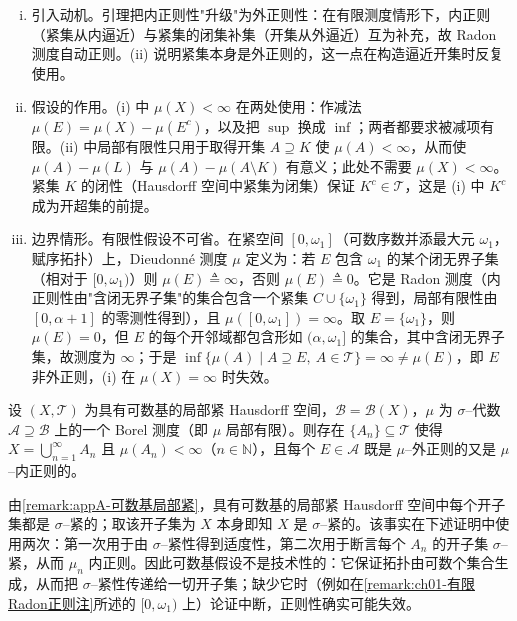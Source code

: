 \documentclass[../../main.tex]{subfiles}%
\begin{document}
\begin{remark}\label{remark:ch01-有限Radon正则注}
\begin{enumerate}[(i)]
\item 引入动机。引理把内正则性"升级"为外正则性：在有限测度情形下，内正则（紧集从内逼近）与紧集的闭集补集（开集从外逼近）互为补充，故 Radon 测度自动正则。(ii) 说明紧集本身是外正则的，这一点在构造逼近开集时反复使用。
\item 假设的作用。(i) 中 $\mu(X)<\infty$ 在两处使用：作减法 $\mu(E)=\mu(X)-\mu(E^c)$，以及把 $\sup$ 换成 $\inf$；两者都要求被减项有限。(ii) 中局部有限性只用于取得开集 $A\supseteq K$ 使 $\mu(A)<\infty$，从而使 $\mu(A)-\mu(L)$ 与 $\mu(A)-\mu(A\setminus K)$ 有意义；此处不需要 $\mu(X)<\infty$。紧集 $K$ 的闭性（Hausdorff 空间中紧集为闭集）保证 $K^c\in\mathcal{T}$，这是 (i) 中 $K^c$ 成为开超集的前提。
\item 边界情形。有限性假设不可省。在紧空间 $[0,\omega_1]$（可数序数并添最大元 $\omega_1$，赋序拓扑）上，Dieudonné 测度 $\mu$ 定义为：若 $E$ 包含 $\omega_1$ 的某个闭无界子集（相对于 $[0,\omega_1)$）则 $\mu(E)\triangleq\infty$，否则 $\mu(E)\triangleq0$。它是 Radon 测度（内正则性由"含闭无界子集"的集合包含一个紧集 $C\cup\{\omega_1\}$ 得到，局部有限性由 $[0,\alpha+1]$ 的零测性得到），且 $\mu([0,\omega_1])=\infty$。取 $E=\{\omega_1\}$，则 $\mu(E)=0$，但 $E$ 的每个开邻域都包含形如 $(\alpha,\omega_1]$ 的集合，其中含闭无界子集，故测度为 $\infty$；于是 $\inf\{\mu(A)\mid A\supseteq E,\ A\in\mathcal{T}\}=\infty\neq\mu(E)$，即 $E$ 非外正则，(i) 在 $\mu(X)=\infty$ 时失效。
\end{enumerate}
\end{remark}

\begin{proposition}\label{proposition:ch01-可数基Borel正则}
设 $(X,\mathcal{T})$ 为具有可数基的局部紧 Hausdorff 空间，$\mathcal{B}=\mathcal{B}(X)$，$\mu$ 为 $\sigma$--代数 $\mathcal{A}\supseteq\mathcal{B}$ 上的一个 Borel 测度（即 $\mu$ 局部有限）。则存在 $\{A_n\}\subseteq\mathcal{T}$ 使得 $X=\bigcup_{n=1}^\infty A_n$ 且 $\mu(A_n)<\infty$（$n\in\mathbb{N}$），且每个 $E\in\mathcal{A}$ 既是 $\mu$--外正则的又是 $\mu$--内正则的。
\end{proposition}

\begin{remark}\label{remark:ch01-附录A1}
由\cref{remark:appA-可数基局部紧}，具有可数基的局部紧 Hausdorff 空间中每个开子集都是 $\sigma$--紧的；取该开子集为 $X$ 本身即知 $X$ 是 $\sigma$--紧的。该事实在下述证明中使用两次：第一次用于由 $\sigma$--紧性得到适度性，第二次用于断言每个 $A_n$ 的开子集 $\sigma$--紧，从而 $\mu_n$ 内正则。因此可数基假设不是技术性的：它保证拓扑由可数个集合生成，从而把 $\sigma$--紧性传递给一切开子集；缺少它时（例如在\cref{remark:ch01-有限Radon正则注}所述的 $[0,\omega_1)$ 上）论证中断，正则性确实可能失效。
\end{remark}
\end{document}
